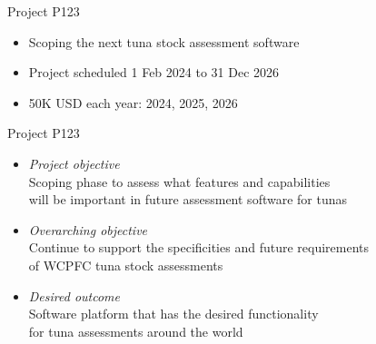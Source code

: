 \documentclass[aspectratio=169]{beamer}
\begin{document}

\begin{frame}{Project P123}\small
  \begin{itemize}
    \item[] Scoping the next tuna stock assessment software\\[5ex]
    \item[] Project scheduled 1 Feb 2024 to 31 Dec 2026\\[5ex]
    \item[] 50K USD each year: 2024, 2025, 2026\\[3ex]
  \end{itemize}
\end{frame}


\begin{frame}{Project P123}\small
  \begin{itemize}
    \item {\it Project objective}\\[0.5ex]
    Scoping phase to assess what features and capabilities\\
    will be important in future assessment software for tunas\\[4ex]

    \item {\it Overarching objective}\\[0.5ex]
    Continue to support the specificities and future requirements\\
    of WCPFC tuna stock assessments\\[4ex]

    \item {\it Desired outcome}\\[0.5ex]
    Software platform that has the desired functionality\\
    for tuna assessments around the world\\[4ex]
  \end{itemize}
\end{frame}

\end{document}

